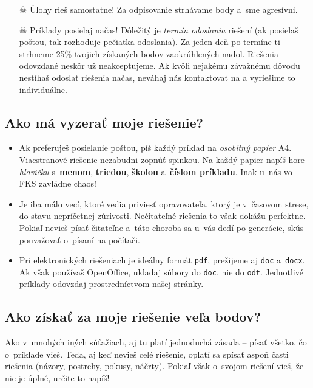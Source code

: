 \begin{itemize}
        \item[$\skull$] Úlohy rieš samostatne! Za odpisovanie strhávame body a~sme agresívni. 
    
        \item[$\skull$] Príklady posielaj načas! Dôležitý je \emph{termín odoslania} riešení (ak posielaš poštou, tak rozhoduje pečiatka odoslania).
            Za jeden deň po termíne ti strhneme 25\% tvojich získaných bodov zaokrúhlených nadol. 
            Riešenia odovzdané neskôr už neakceptujeme. Ak kvôli nejakému závažnému dôvodu nestíhaš odoslať riešenia načas, neváhaj nás kontaktovať na 
            a vyriešime to individuálne.
    \end{itemize}

\subsection{Ako má vyzerať moje riešenie?}
    \begin{itemize}
        \item Ak preferuješ posielanie poštou, píš každý príklad na \emph{osobitný papier} A4. Viacstranové riešenie nezabudni
            zopnúť spinkou. Na každý papier napíš hore \emph{hlavičku} s~\textbf{menom}, \textbf{triedou}, \textbf{školou} a~\textbf{číslom príkladu}.
            Inak u~nás vo FKS zavládne chaos!
        \item Je iba málo vecí, ktoré vedia priviesť opravovateľa, ktorý je v~časovom strese, do stavu nepríčetnej zúrivosti. Nečitateľné riešenia to však dokážu perfektne.
            Pokiaľ nevieš písať čitateľne a~táto choroba sa u~vás dedí po generácie, skús pouvažovať o~písaní na počítači.
        \item Pri elektronických riešeniach je ideálny formát \texttt{pdf}, prežijeme aj \texttt{doc} a~\texttt{docx}.
            Ak však používaš OpenOffice, ukladaj súbory do \texttt{doc}, nie do \texttt{odt}.
            Jednotlivé príklady odovzdaj prostredníctvom našej stránky.
    \end{itemize}

\subsection{Ako získať za moje riešenie veľa bodov?}
    Ako v~mnohých iných súťažiach, aj tu platí jednoduchá zásada -- písať všetko, čo
    o~príklade vieš. Teda, aj keď nevieš celé riešenie, oplatí sa spísať aspoň časti
    riešenia (názory, postrehy, pokusy, náčrty). Pokiaľ však o~svojom riešení vieš, že
    nie je úplné, určite to napíš!

